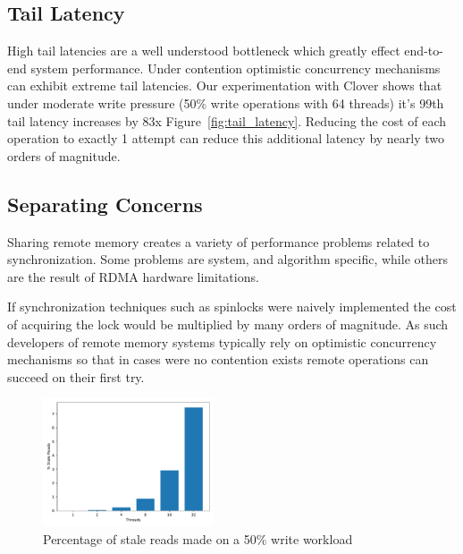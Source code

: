 \subsection{Tail Latency}

High tail latencies are a well understood bottleneck which greatly effect
end-to-end system performance. Under contention optimistic concurrency
mechanisms can exhibit extreme tail latencies. Our experimentation with Clover
shows that under moderate write pressure (50\% write operations with 64 threads)
it's 99th tail latency increases by 83x Figure~\ref{fig:tail_latency}. Reducing the
cost of each operation to exactly 1 attempt can reduce this additional latency
by nearly two orders of magnitude.


\subsection{Separating Concerns}

Sharing remote memory creates a variety of performance problems related to
synchronization. Some problems are system, and algorithm specific, while others
are the result of RDMA hardware limitations. 

If synchronization techniques such as spinlocks were naively
implemented the cost of acquiring the lock would be multiplied by many orders of
magnitude. As such developers of remote memory systems typically rely on
optimistic concurrency mechanisms so that in cases were no contention exists
remote operations can succeed on their first try.

\begin{figure}[t]
    \includegraphics[width=0.45\textwidth]{fig/stale_reads.pdf}
    \caption{Percentage of stale reads made on a 50\% write workload}
    \label{fig:stale_reads}
\end{figure}


